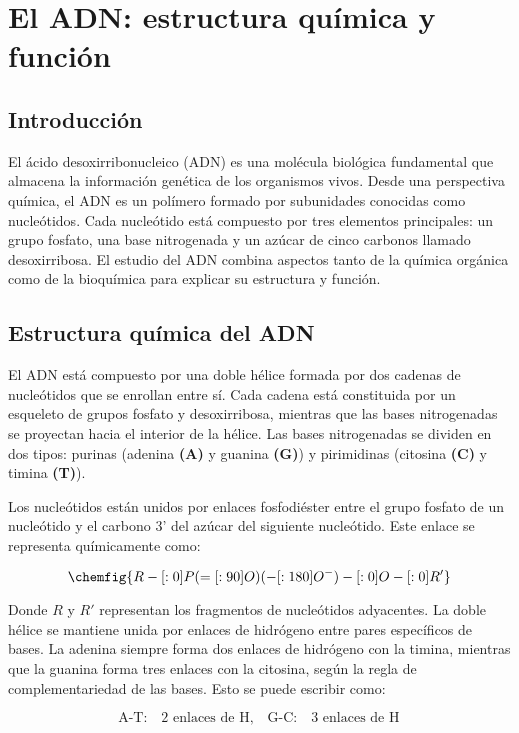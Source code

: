 \chapter{El ADN: estructura química y función}

\section{Introducción}

El ácido desoxirribonucleico (ADN) es una molécula biológica fundamental que almacena la información genética de los organismos vivos. Desde una perspectiva química, el ADN es un polímero formado por subunidades conocidas como nucleótidos. Cada nucleótido está compuesto por tres elementos principales: un grupo fosfato, una base nitrogenada y un azúcar de cinco carbonos llamado desoxirribosa. El estudio del ADN combina aspectos tanto de la química orgánica como de la bioquímica para explicar su estructura y función.

\section{Estructura química del ADN}

El ADN está compuesto por una doble hélice formada por dos cadenas de nucleótidos que se enrollan entre sí. Cada cadena está constituida por un esqueleto de grupos fosfato y desoxirribosa, mientras que las bases nitrogenadas se proyectan hacia el interior de la hélice. Las bases nitrogenadas se dividen en dos tipos: purinas (adenina \textbf{(A)} y guanina \textbf{(G)}) y pirimidinas (citosina \textbf{(C)} y timina \textbf{(T)}).

Los nucleótidos están unidos por enlaces fosfodiéster entre el grupo fosfato de un nucleótido y el carbono 3' del azúcar del siguiente nucleótido. Este enlace se representa químicamente como:

\begin{equation*}
\chemfig{R-[:0]P(=[:90]O)(-[:180]O^-)-[:0]O-[:0]R'}
\end{equation*}

Donde $R$ y $R'$ representan los fragmentos de nucleótidos adyacentes. La doble hélice se mantiene unida por enlaces de hidrógeno entre pares específicos de bases. La adenina siempre forma dos enlaces de hidrógeno con la timina, mientras que la guanina forma tres enlaces con la citosina, según la regla de complementariedad de las bases. Esto se puede escribir como:

\begin{equation*}
\text{A-T:} \quad \text{2 enlaces de H}, \quad \text{G-C:} \quad \text{3 enlaces de H}
\end{equation*}

